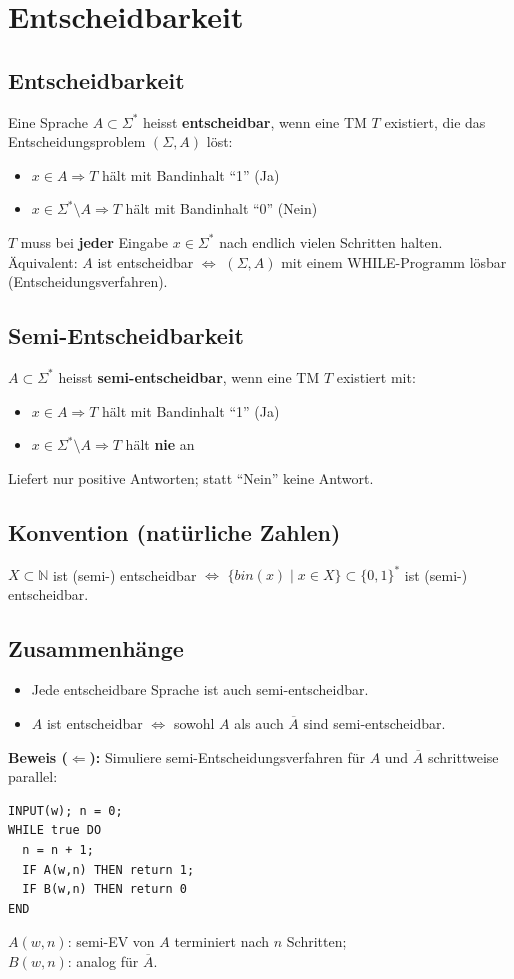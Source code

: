 \section{Entscheidbarkeit}

\subsection{Entscheidbarkeit}
Eine Sprache $A \subset \Sigma^*$ heisst \textbf{entscheidbar}, wenn eine TM $T$ existiert, die das Entscheidungsproblem $(\Sigma, A)$ löst:
\begin{itemize}
    \item $x \in A \Rightarrow T$ hält mit Bandinhalt ``1'' (Ja)
    \item $x \in \Sigma^* \setminus A \Rightarrow T$ hält mit Bandinhalt ``0'' (Nein)
\end{itemize}
$T$ muss bei \textbf{jeder} Eingabe $x \in \Sigma^*$ nach endlich vielen Schritten halten.\\
Äquivalent: $A$ ist entscheidbar $\Leftrightarrow$ $(\Sigma, A)$ mit einem WHILE-Programm lösbar (Entscheidungsverfahren).

\subsection{Semi-Entscheidbarkeit}
$A \subset \Sigma^*$ heisst \textbf{semi-entscheidbar}, wenn eine TM $T$ existiert mit:
\begin{itemize}
    \item $x \in A \Rightarrow T$ hält mit Bandinhalt ``1'' (Ja)
    \item $x \in \Sigma^* \setminus A \Rightarrow T$ hält \textbf{nie} an
\end{itemize}
Liefert nur positive Antworten; statt ``Nein'' keine Antwort.

\subsection{Konvention (natürliche Zahlen)}
$X \subset \mathbb{N}$ ist (semi-) entscheidbar $\Leftrightarrow$ $\{bin(x) \mid x \in X\} \subset \{0,1\}^*$ ist (semi-) entscheidbar.

\subsection{Zusammenhänge}
\begin{itemize}
    \item Jede entscheidbare Sprache ist auch semi-entscheidbar.
    \item $A$ ist entscheidbar $\Leftrightarrow$ sowohl $A$ als auch $\overline{A}$ sind semi-entscheidbar.
\end{itemize}
\textbf{Beweis ($\Leftarrow$):} Simuliere semi-Entscheidungsverfahren für $A$ und $\overline{A}$ schrittweise parallel:
\begin{verbatim}
INPUT(w); n = 0;
WHILE true DO
  n = n + 1;
  IF A(w,n) THEN return 1;
  IF B(w,n) THEN return 0
END
\end{verbatim}
$A(w,n)$: semi-EV von $A$ terminiert nach $n$ Schritten;\\$B(w,n)$: analog für $\overline{A}$.

